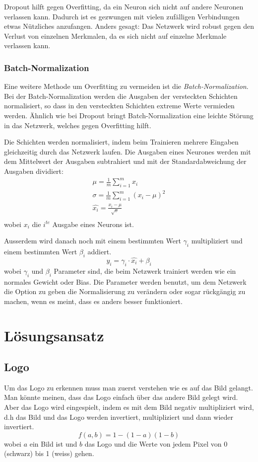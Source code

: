 \documentclass[12pt,a4paper]{report}
\begin{document}
Dropout hilft gegen Overfitting,
da ein Neuron sich nicht auf andere Neuronen verlassen kann.
Dadurch ist es gezwungen mit vielen zufälligen Verbindungen etwas Nützliches anzufangen.
Anders gesagt: Das Netzwerk wird robust gegen den Verlust von einzelnen Merkmalen, da es sich nicht auf einzelne Merkmale verlassen kann.

\subsection{Batch-Normalization}
Eine weitere Methode um Overfitting zu vermeiden ist die \textit{Batch-Normalization}.
Bei der Batch-Normalization werden die Ausgaben der versteckten Schichten normalisiert\cite{batchnorm},
so dass in den versteckten Schichten extreme Werte vermieden werden\cite{batchnorm}.
Ähnlich wie bei Dropout bringt Batch-Normalization eine leichte Störung in das Netzwerk,
welches gegen Overfitting hilft\cite{batchnorm}.

Die Schichten werden normalisiert, indem beim Trainieren mehrere Eingaben gleichzeitig durch das Netzwerk laufen.
Die Ausgaben eines Neurones werden mit dem Mittelwert der Ausgaben subtrahiert und mit der
Standardabweichung der Ausgaben dividiert\cite{batchnorm}:
\begin{gather*}
    \mu = \frac{1}{m}\sum^m_{i=1}x_{i}\\
    \sigma = \frac{1}{m}\sum^m_{i=1}(x_i - \mu)^2\\
    \hat{x_i} = \frac{x_i - \mu}{\sqrt{\sigma}}\\
\end{gather*}
wobei $x_i$ die $i^{te}$ Ausgabe eines Neurons ist.

Ausserdem wird danach noch mit einem bestimmten Wert $\gamma_i$ multipliziert und einem bestimmten Wert $\beta_i$ addiert.
\[y_i = \gamma_i \cdot \hat{x_i} + \beta_i \]
wobei $\gamma_i$ und $\beta_i$ Parameter sind, die beim Netzwerk trainiert werden wie ein normales Gewicht oder Bias\cite{batchnorm}.
Die Parameter werden benutzt, um dem Netzwerk die Option zu geben die Normalisierung zu verändern oder sogar rückgängig zu machen, wenn es meint,
dass es anders besser funktioniert\cite{batchnorm_paper}.

\chapter{Lösungsansatz}
\label{ch:lösungsansatz}
\section{Logo}
Um das Logo zu erkennen muss man zuerst verstehen wie es auf das Bild gelangt.
Man könnte meinen, dass das Logo einfach über das andere Bild gelegt wird.
Aber das Logo wird eingespielt, indem es mit dem Bild negativ multipliziert wird,
d.h das Bild und das Logo werden invertiert, multipliziert und dann wieder invertiert\cite{wiki:blend}.
\[f(a,b) = 1 - (1-a)(1-b)\]
wobei $a$ ein Bild ist und $b$ das Logo und die Werte von jedem Pixel von 0 (schwarz) bis 1 (weiss) gehen.
\end{document}
